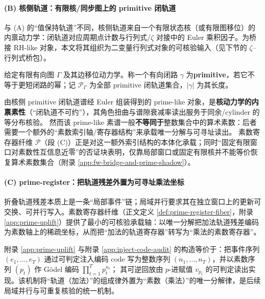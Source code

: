 \paragraph{(B) 核侧轨道：有限核/同步图上的 primitive 闭轨道}
与 (A) 的“值保持轨道”不同，核侧轨道来自一个有限状态核（或有限图移位）的内禀动力学：闭轨道对应周期点计数与行列式/$\zeta$ 对接中的 Euler 乘积因子。为桥接 RH-like 对象，本文将其组织为二变量行列式对象的可核验输入（见下节的 $\zeta$–行列式桥包）。

\begin{definition}[primitive 轨道]\label{def:primitive-orbit}
给定有限有向图 $\Gamma$ 及其边移位动力学。称一个有向闭路 $\gamma$ 为\textbf{primitive}，若它不等于更短闭路的幂；记 $\mathcal{P}_\Gamma$ 为全部 primitive 闭轨道集合，$|\gamma|$ 为其长度。
\end{definition}

\begin{remark}\label{rem:prime-shadow-vs-primes-bridge}
由核侧 primitive 闭轨道谱经 Euler 组装得到的 prime-like 对象，是\textbf{核动力学的内禀素性}（“闭轨道不可约”），其角色扭曲与谱隙衰减率读出服务于同余/cylinder 的等分布核验。
然而该 prime-like 素谱一般\textbf{不等同于}整数集合中的算术素数：后者需要一个额外的“素数索引轴/寄存器结构”来承载唯一分解与可寻址读出。
素数寄存器纤维 $\mathcal{P}$（段 (C)）正是对这一额外索引结构的本体化承载；同时“固定有限窗口对素数性互信息近零”的否证块表明，仅靠局部窗口或固定有限核并不能等价恢复算术素数集合（附录 \ref{app:fw-bridge-and-prime-shadow}）。
\end{remark}

\paragraph{(C) prime-register：把轨道残差外置为可寻址乘法坐标}
折叠轨道残差本质上是一条“局部事件”链；局域并行要求其在独立窗口上的更新可交换、可并行写入。素数寄存器纤维（正文定义 \ref{def:prime-register-fiber}，附录 \ref{app:prime-uplift}）提供了最小的可核验承载轴：以唯一分解把加法轨道残差编码为素数轴上的稀疏坐标，从而把“加法的轨道寄存器”转写为“乘法的素数寄存器”。

\begin{remark}\label{rem:orbit-residual-godel}
附录 \ref{app:prime-uplift} 与附录 \ref{app:inject-code-audit} 的构造等价于：把事件序列 $(e_1,\dots,e_T)$ 通过可判定注入编码 $\mathrm{code}$ 写为整数序列 $(n_1,\dots,n_T)$，并以素数序列 $(p_t)$ 作 Gödel 编码
$
\prod_{t=1}^{T}p_t^{n_t}
$；
其可逆回放由 $p$-进赋值 $v_{p_t}$ 的可判定读出实现。该机制将“轨道（加法）”的组成律外置为“素数（乘法）”的唯一分解律，是后续局域并行与可重复核验的统一机制。
\end{remark}

